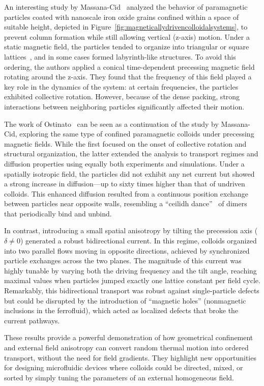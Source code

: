 An interesting study by Massana-Cid~\cite{massana2020emergent} analyzed the behavior of paramagnetic particles coated with nanoscale iron oxide grains confined within a space of suitable height, depicted in Figure~\ref{fig:magneticallydrivencolloidalsystems}, to prevent column formation while still allowing vertical (z-axis) motion. Under a static magnetic field, the particles tended to organize into triangular or square lattices~\cite{osterman2007observation}, and in some cases formed labyrinth-like structures. To avoid this ordering, the authors applied a conical time-dependent precessing magnetic field rotating around the z-axis. They found that the frequency of this field played a key role in the dynamics of the system: at certain frequencies, the particles exhibited collective rotation. However, because of the dense packing, strong interactions between neighboring particles significantly affected their motion.

The work of Ostinato~\cite{ostinato2024magnetically} can be seen as a continuation of the study by Massana-Cid, exploring the same type of confined paramagnetic colloids under precessing magnetic fields. While the first focused on the onset of collective rotation and structural organization, the latter extended the analysis to transport regimes and diffusion properties using equally both experiments and simulations.
Under a spatially isotropic field, the particles did not exhibit any net current but showed a strong increase in diffusion—up to sixty times higher than that of undriven colloids. This enhanced diffusion resulted from a continuous position exchange between particles near opposite walls, resembling a ``ceilidh dance''~\cite{meng2020field} of dimers that periodically bind and unbind.


In contrast, introducing a small spatial anisotropy by tilting the precession axis ($\delta \neq 0$) generated a robust bidirectional current. In this regime, colloids organized into two parallel flows moving in opposite directions, achieved by synchronized particle exchanges across the two planes. The magnitude of this current was highly tunable by varying both the driving frequency and the tilt angle, reaching maximal values when particles jumped exactly one lattice constant per field cycle. Remarkably, this bidirectional transport was robust against single-particle defects but could be disrupted by the introduction of ``magnetic holes'' (nonmagnetic inclusions in the ferrofluid), which acted as localized defects that broke the current pathways.

These results provide a powerful demonstration of how geometrical confinement and external field anisotropy can convert random thermal motion into ordered transport, without the need for field gradients. They highlight new opportunities for designing microfluidic devices where colloids could be directed, mixed, or sorted by simply tuning the parameters of an external homogeneous field.

